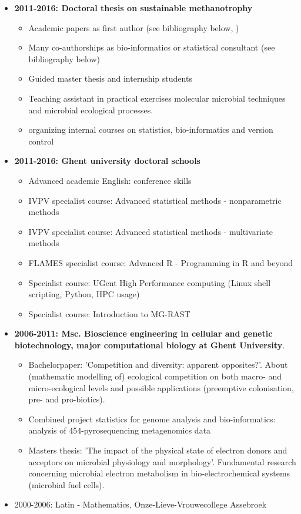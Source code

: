 \documentclass[a4paper,11pt,oneside]{article}
\begin{document}
\begin{itemize}
\item \textbf{2011-2016: Doctoral thesis on sustainable methanotrophy}
    \begin{itemize}
      \item Academic papers as first author (see bibliography below, \cite{kerckhof2014optimized})
      \item Many co-authorships as bio-informatics or statistical consultant  (see bibliography below)
      \item Guided master thesis and internship students
      \item Teaching assistant in practical exercises molecular microbial techniques and microbial ecological processes.
      \item organizing internal courses on statistics, bio-informatics and version control
    \end{itemize}
\item \textbf{2011-2016: Ghent university doctoral schools}
    \begin{itemize}
      \item Advanced academic English: conference skills
      \item IVPV specialist course: Advanced statistical methods - nonparametric methods
      \item IVPV specialist course: Advanced statistical methods - multivariate methods
      \item FLAMES specialist course: Advanced R - Programming in R and beyond
      \item Specialist course: UGent High Performance computing (Linux shell scripting, Python, HPC usage)
      \item Specialist course: Introduction to MG-RAST
    \end{itemize}
\item \textbf{2006-2011: Msc. Bioscience engineering in cellular and genetic biotechnology, major computational biology at Ghent University}. 
	\begin{itemize}
		\item Bachelorpaper: 'Competition and diversity: apparent opposites?'. About (mathematic modelling of) ecological competition on both macro- and micro-ecological levels and possible applications (preemptive colonisation, pre- and pro-biotics).
		\item Combined project statistics for genome analysis and bio-informatics: analysis of 454-pyrosequencing metagenomics data
		\item Masters thesis: 'The impact of the physical state of electron donors and acceptors on microbial physiology and morphology'. Fundamental research concerning microbial electron metabolism in bio-electrochemical systems (microbial fuel cells).
	\end{itemize}
\item 2000-2006: Latin - Mathematics, Onze-Lieve-Vrouwecollege Assebroek
\end{itemize}
\end{document}
